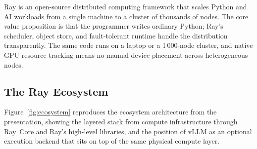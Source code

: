 \documentclass[12pt,a4paper]{article}
\begin{document}
Ray is an open-source distributed computing framework that scales Python
and AI workloads from a single machine to a cluster of thousands of
nodes. The core value proposition is that the programmer writes ordinary
Python; Ray's scheduler, object store, and fault-tolerant runtime handle
the distribution transparently. The same code runs on a laptop or a
1\,000-node cluster, and native GPU resource tracking means no manual
device placement across heterogeneous nodes.

\subsection{The Ray Ecosystem}

Figure~\ref{fig:ecosystem} reproduces the ecosystem architecture from
the presentation, showing the layered stack from compute infrastructure
through Ray~Core and Ray's high-level libraries, and the position of
vLLM as an optional execution backend that sits on top of the same
physical compute layer.
\end{document}
